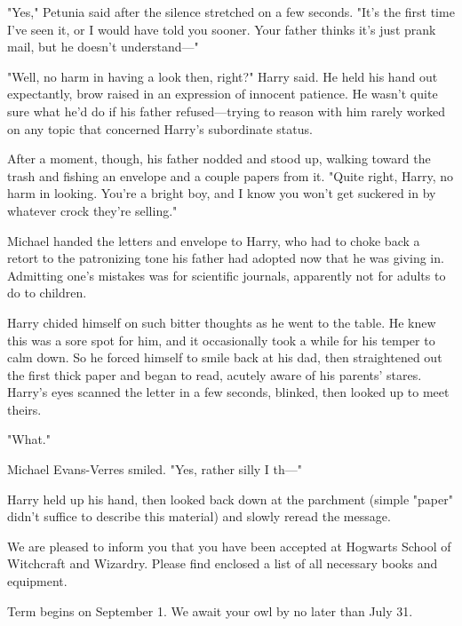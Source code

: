 "Yes," Petunia said after the silence stretched on a few
seconds. "It's the first time I've seen it, or I would have
told you sooner. Your father thinks it's just prank mail, but
he doesn't understand—"

"Well, no harm in having a look then, right?" Harry said.
He held his hand out expectantly, brow raised in an
expression of innocent patience. He wasn't quite sure what
he'd do if his father refused—trying to reason with him
rarely worked on any topic that concerned Harry's
subordinate status.

After a moment, though, his father nodded and stood up,
walking toward the trash and fishing an envelope and a
couple papers from it. "Quite right, Harry, no harm in
looking. You're a bright boy, and I know you won't get
suckered in by whatever crock they're selling."

Michael handed the letters and envelope to Harry, who
had to choke back a retort to the patronizing tone his
father had adopted now that he was giving in. Admitting
one's mistakes was for scientific journals, apparently{\el} not
for adults to do to children.

Harry chided himself on such bitter thoughts as he went
to the table. He knew this was a sore spot for him, and it
occasionally took a while for his temper to calm down. So
he forced himself to smile back at his dad, then
straightened out the first thick paper and began to
read, acutely aware of his parents' stares.
Harry's eyes scanned the letter in a few seconds, blinked,
then looked up to meet theirs.

"What."

Michael Evans-Verres smiled. "Yes, rather silly I th—"

Harry held up his hand, then looked back down at the
parchment (simple "paper" didn't suffice to describe this material)
and slowly reread the message.

\begin{writtenNote}

We are pleased to inform you that you have been
accepted at Hogwarts School of Witchcraft and Wizardry.
Please find enclosed a list of all necessary books and
equipment.

Term begins on September 1. We await your owl by no
later than July 31.

\end{writtenNote}

